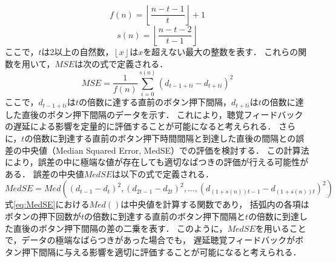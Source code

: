 \documentclass{article} %
\begin{document}
\begin{equation}
f(n) = \left\lfloor \frac{n-t-1}{t} \right\rfloor + 1
\end{equation}
\begin{equation}
s(n) = \left\lfloor \frac{n-t-2}{t-1} \right\rfloor
\end{equation}
ここで，$t$は2以上の自然数，$\left\lfloor x \right\rfloor$は$x$を超えない最大の整数を表す．
これらの関数を用いて，$MSE$は次の式で定義される．
\begin{equation}
MSE = \frac{1}{f(n)} \sum_{i=0}^{s(n)} (d_{t-1+ti} - d_{t+ti})^2
\end{equation}
ここで，$d_{t-1+ti}$は$t$の倍数に達する直前のボタン押下間隔，$d_{t+ti}$は$t$の倍数に達した直後のボタン押下間隔のデータを示す．
これにより，聴覚フィードバックの遅延による影響を定量的に評価することが可能になると考えられる．
さらに，$t$の倍数に到達する直前のボタン押下時間間隔と到達した直後の間隔との誤差の中央値（Median Squared Error, MedSE）での評価を検討する．
この計算法により，誤差の中に極端な値が存在しても適切なばつきの評価が行える可能性がある．
誤差の中央値$MedSE$は以下の式で定義される．
\begin{equation}
MedSE = Med((d_{t-1}-d_{t})^2, (d_{2t-1}-d_{2t})^2, \ldots, (d_{(1+s(n))t-1}-d_{(1+s(n))t})^2) \label{eq:MedSE}
\end{equation}
式\ref{eq:MedSE}における$Med()$は中央値を計算する関数であり，
括弧内の各項はボタンの押下回数が$t$の倍数に到達する直前のボタン押下間隔と$t$の倍数に到達した直後のボタン押下間隔の差の二乗を表す．
このように，$MedSE$を用いることで，データの極端なばらつきがあった場合でも，
遅延聴覚フィードバックがボタン押下間隔に与える影響を適切に評価することが可能になると考えられる．

\end{document}
